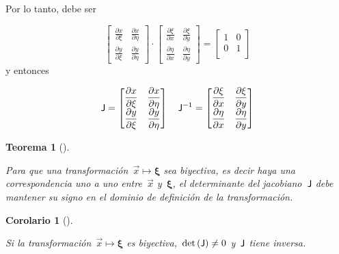 \documentclass[
  12pt,
  a4paper,
  table]{scrbook}
\theoremstyle{plain}
\theoremstyle{definition}
\theoremstyle{plain}
\newtheorem{theorem}{Teorema}[chapter]
\theoremstyle{plain}
\newtheorem{corollary}{Corolario}[chapter]
\theoremstyle{remark}
\begin{document}
Por lo tanto, debe ser

\[
\begin{bmatrix}
\displaystyle \frac{\partial x}{\partial \xi} & \displaystyle \frac{\partial x}{\partial \eta} \\
\displaystyle \frac{\partial y}{\partial \xi} & \displaystyle \frac{\partial y}{\partial \eta}
\end{bmatrix}
\cdot
\begin{bmatrix}
\displaystyle \frac{\partial \xi}{\partial x}  & \displaystyle \frac{\partial \xi}{\partial y} \\
\displaystyle \frac{\partial \eta}{\partial x} & \displaystyle \frac{\partial \eta}{\partial y}
\end{bmatrix}
=
\begin{bmatrix}
1 & 0 \\
0 & 1 \\
\end{bmatrix}
\] y entonces

\[
\mathsf{J} = 
\begin{bmatrix}
\displaystyle \frac{\partial x}{\partial \xi} & \displaystyle \frac{\partial x}{\partial \eta} \\
\displaystyle \frac{\partial y}{\partial \xi} & \displaystyle \frac{\partial y}{\partial \eta}
\end{bmatrix}
\quad
\mathsf{J}^{-1} = 
\begin{bmatrix}
\displaystyle \frac{\partial \xi}{\partial x}  & \displaystyle \frac{\partial \xi}{\partial y} \\
\displaystyle \frac{\partial \eta}{\partial x} & \displaystyle \frac{\partial \eta}{\partial y}
\end{bmatrix}
\]

\begin{theorem}[]\protect\hypertarget{thm-biyectiva}{}\label{thm-biyectiva}

Para que una transformación~\(\vec{x} \mapsto \symbf{\xi}\) sea
biyectiva, es decir haya una correspondencia uno a uno entre~\(\vec{x}\)
y~\(\symbf{\xi}\), el determinante del jacobiano~\(\mathsf{J}\) debe
mantener su signo en el dominio de definición de la transformación.

\end{theorem}

\begin{corollary}[]\protect\hypertarget{cor-detJ}{}\label{cor-detJ}

Si la transformación~\(\vec{x} \mapsto \symbf{\xi}\) es
biyectiva,~\(\det{(\mathsf{J})} \neq 0\) y~\(\mathsf{J}\) tiene inversa.

\end{corollary}
\end{document}
